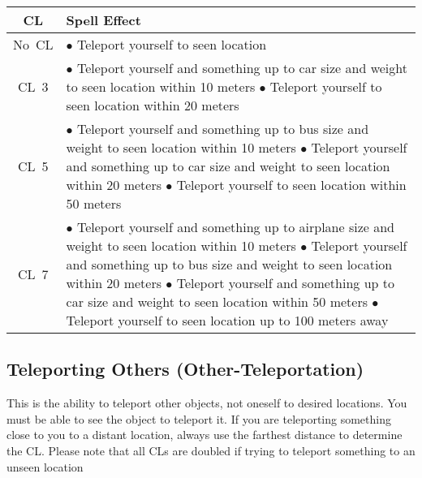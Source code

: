 \begin{center}
    \begin{tabular}{|c m{}|} 
      \hline
      \textbf{CL} & \textbf{Spell Effect} \\ 
      \hline
      No~CL & 
        $\bullet$ Teleport yourself to seen location \\ \hline
      CL~3 & 
        $\bullet$ Teleport yourself and something up to car size and weight to seen location within 10 meters  \newline
        $\bullet$ Teleport yourself to seen location within 20 meters \\ \hline
      CL~5 & 
        $\bullet$ Teleport yourself and something up to bus size and weight to seen location within 10 meters  \newline
        $\bullet$ Teleport yourself and something up to car size and weight to seen location within 20 meters \newline
        $\bullet$ Teleport yourself to seen location within 50 meters \\ \hline
      CL~7 &
        $\bullet$ Teleport yourself and something up to airplane size and weight to seen location within 10 meters \newline
        $\bullet$ Teleport yourself and something up to bus size and weight to seen location within 20 meters \newline
        $\bullet$ Teleport yourself and something up to car size and weight to seen location within 50 meters \newline
        $\bullet$ Teleport yourself to seen location up to 100 meters away \\
      \hline
    \end{tabular}
\end{center}

\subsection{Teleporting Others (Other-Teleportation)}

This is the ability to teleport other objects, not oneself to desired locations. You must be able to see the object to teleport it. If you are teleporting something close to you to a distant location, always use the farthest distance to determine the CL. Please note that all CLs are doubled if trying to teleport something to an unseen location

